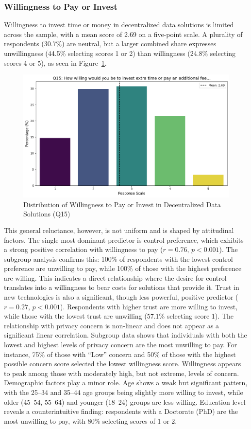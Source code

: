 	\subsubsection{Willingness to Pay or Invest}
	Willingness to invest time or money in decentralized data solutions is limited across the sample, with a mean score of 2.69 on a five-point scale. A plurality of respondents (30.7\%) are neutral, but a larger combined share expresses unwillingness (44.5\% selecting scores 1 or 2) than willingness (24.8\% selecting scores 4 or 5), as seen in Figure~\ref{fig:WTP_distribution}. 
	\begin{figure}[ht]\centering
		\includegraphics[width=0.7\linewidth]{figures/questions/Q15_likert.png}
		\caption{Distribution of Willingness to Pay or Invest in Decentralized Data Solutions (Q15)}
		\label{fig:WTP_distribution}
	\end{figure}
	This general reluctance, however, is not uniform and is shaped by attitudinal factors.
	The single most dominant predictor is control preference, which exhibits a strong positive correlation with willingness to pay ($r = 0.76$, $p < 0.001$). The subgroup analysis confirms this: 100\% of respondents with the lowest control preference are unwilling to pay, while 100\% of those with the highest preference are willing. This indicates a direct relationship where the desire for control translates into a willingness to bear costs for solutions that provide it.
	Trust in new technologies is also a significant, though less powerful, positive predictor ($r = 0.27$, $p < 0.001$). Respondents with higher trust are more willing to invest, while those with the lowest trust are unwilling (57.1\% selecting score 1).
	The relationship with privacy concern is non-linear and does not appear as a significant linear correlation. Subgroup data shows that individuals with both the lowest and highest levels of privacy concern are the most unwilling to pay. For instance, 75\% of those with ``Low'' concern and 50\% of those with the highest possible concern score selected the lowest willingness score. Willingness appears to peak among those with moderately high, but not extreme, levels of concern.
	Demographic factors play a minor role. Age shows a weak but significant pattern, with the 25--34 and 35--44 age groups being slightly more willing to invest, while older (45--54, 55--64) and younger (18--24) groups are less willing. Education level reveals a counterintuitive finding: respondents with a Doctorate (PhD) are the most unwilling to pay, with 80\% selecting scores of 1 or 2.		
